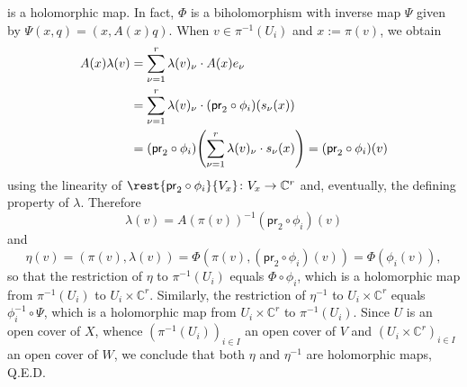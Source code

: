 \documentclass[a4paper]{amsart}
\newcommand{\C}{\mathbb{C}}
\newcommand{\pr}[1]{\mathsf{pr}_{#1}}
\theoremstyle{remark}
\numberwithin{equation}{question}
\DeclarePairedDelimiter\paren{(}{)}
\begin{document}
\begin{solution}
\[\]
is a holomorphic map. In fact, $\Phi$ is a biholomorphism with inverse map $\Psi$ given by $\Psi(x,q) = (x,A(x)q)$.
When $v \in \pi^{-1}(U_i)$ and $x := \pi(v)$, we obtain
\begin{align*}
A(x)\lambda(v) &= \sum_{\nu=1}^r \lambda(v)_\nu \cdot A(x)e_\nu \\
&= \sum_{\nu=1}^r \lambda(v)_\nu \cdot (\pr2 \circ \phi_i)(s_\nu(x)) \\
&= (\pr2 \circ \phi_i)\paren*{\sum_{\nu=1}^r \lambda(v)_\nu \cdot s_\nu(x)} = (\pr2 \circ \phi_i)(v)
\end{align*}
using the linearity of $\rest{\pr2 \circ \phi_i}{V_x} \colon V_x \to \C^r$ and, eventually, the defining property of $\lambda$. Therefore
\[
\lambda(v) = A(\pi(v))^{-1}(\pr2 \circ \phi_i)(v)
\]
and
\[
\eta(v) = (\pi(v),\lambda(v)) = \Phi(\pi(v),(\pr2 \circ \phi_i)(v)) = \Phi(\phi_i(v)),
\]
so that the restriction of $\eta$ to $\pi^{-1}(U_i)$ equals $\Phi \circ \phi_i$, which is a holomorphic map from $\pi^{-1}(U_i)$ to $U_i \times \C^r$. Similarly, the restriction of $\eta^{-1}$ to $U_i \times \C^r$ equals $\phi_i^{-1} \circ \Psi$, which is a holomorphic map from $U_i \times \C^r$ to $\pi^{-1}(U_i)$. Since $U$ is an open cover of $X$, whence $(\pi^{-1}(U_i))_{i \in I}$ an open cover of $V$ and $(U_i \times \C^r)_{i \in I}$ an open cover of $W$, we conclude that both $\eta$ and $\eta^{-1}$ are holomorphic maps, Q.E.D.
\end{solution}
\end{document}
